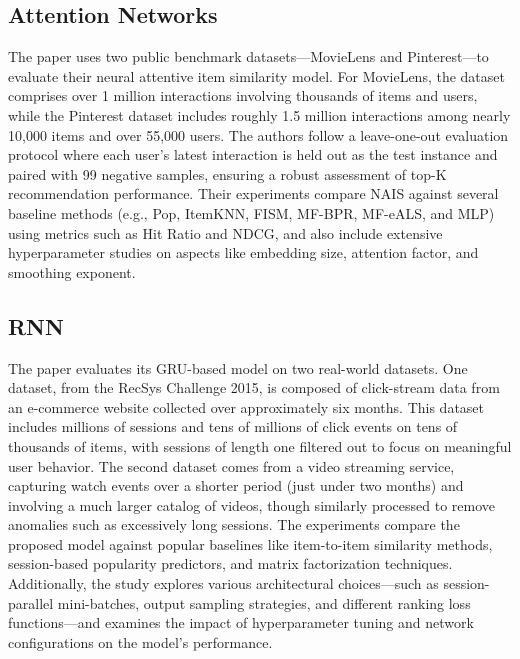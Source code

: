 \documentclass{ieeetj}
\begin{document}
\subsection{Attention Networks \cite{nais1}}
The paper uses two public benchmark datasets—MovieLens and Pinterest—to evaluate their neural attentive item similarity model. For MovieLens, the dataset comprises over 1 million interactions involving thousands of items and users, while the Pinterest dataset includes roughly 1.5 million interactions among nearly 10,000 items and over 55,000 users. The authors follow a leave-one-out evaluation protocol where each user’s latest interaction is held out as the test instance and paired with 99 negative samples, ensuring a robust assessment of top-K recommendation performance. Their experiments compare NAIS against several baseline methods (e.g., Pop, ItemKNN, FISM, MF-BPR, MF-eALS, and MLP) using metrics such as Hit Ratio and NDCG, and also include extensive hyperparameter studies on aspects like embedding size, attention factor, and smoothing exponent.

\subsection{RNN\cite{hidasi2015session}}
The paper evaluates its GRU-based model on two real-world datasets. One dataset, from the RecSys Challenge 2015, is composed of click-stream data from an e-commerce website collected over approximately six months. This dataset includes millions of sessions and tens of millions of click events on tens of thousands of items, with sessions of length one filtered out to focus on meaningful user behavior. The second dataset comes from a video streaming service, capturing watch events over a shorter period (just under two months) and involving a much larger catalog of videos, though similarly processed to remove anomalies such as excessively long sessions. The experiments compare the proposed model against popular baselines like item-to-item similarity methods, session-based popularity predictors, and matrix factorization techniques. Additionally, the study explores various architectural choices—such as session-parallel mini-batches, output sampling strategies, and different ranking loss functions—and examines the impact of hyperparameter tuning and network configurations on the model's performance.

\end{document}
